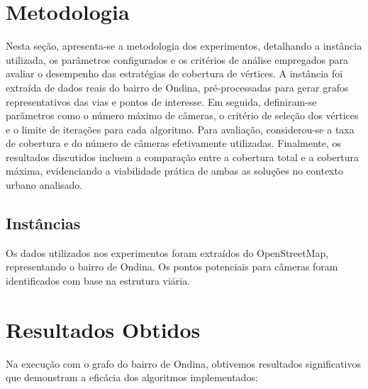 \documentclass[12pt, a4paper]{report}
\begin{document}
\section{Metodologia}
\noindent
Nesta seção, apresenta-se a metodologia dos experimentos, detalhando a instância utilizada, os parâmetros configurados e os critérios de análise empregados para avaliar o desempenho das estratégias de cobertura de vértices. A instância foi extraída de dados reais do bairro de Ondina, pré-processadas para gerar grafos representativos das vias e pontos de interesse. Em seguida, definiram-se parâmetros como o número máximo de câmeras, o critério de seleção dos vértices e o limite de iterações para cada algoritmo. Para avaliação, considerou-se a taxa de cobertura e do número de câmeras efetivamente utilizadas. Finalmente, os resultados discutidos incluem a comparação entre a cobertura total e a cobertura máxima, evidenciando a viabilidade prática de ambas as soluções no contexto urbano analisado.

\subsection{Instâncias}
Os dados utilizados nos experimentos foram extraídos do OpenStreetMap, representando o bairro de Ondina. Os pontos potenciais para câmeras foram identificados com base na estrutura viária.

\section{Resultados Obtidos}
Na execução com o grafo do bairro de Ondina, obtivemos resultados significativos que demonstram a eficácia dos algoritmos implementados:
\end{document}
